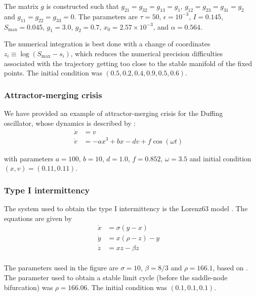 \documentclass[reprint,superscriptaddress,showpacs,amsmath,amssymb,aps,floatfix,nolongbibliography]{revtex4-2}
\theoremstyle{definition}
\begin{document}
The matrix $g$ is constructed such that $g_{21} = g_{32} = g_{13} = g_1$, $g_{12} = g_{23} = g_{31} = g_2$ and $g_{11} = g_{22} = g_{33} = 0$. The parameters are $\tau = 50$, $\epsilon = 10^{-3}$, $I = 0.145$, $S_\mathrm{max} = 0.045$, $g_1 = 3.0$, $g_2 = 0.7$, $x_0 = 2.57 \times 10^{-3}$, and $\alpha = 0.564$.

The numerical integration is best done with a change of coordinates $z_i \equiv \log(S_\mathrm{max} - s_i)$, which reduces the numerical precision difficulties associated with the trajectory getting too close to the stable manifold of the fixed points. The initial condition was $(0.5, 0.2, 0.4, 0.9, 0.5, 0.6)$. 


\subsubsection{Attractor-merging crisis}
We have provided an example of attractor-merging crisis for the Duffing oscillator, whose dynamics is described by \cite{ishii1986breakdown}: 
%
\begin{align}
    \dot{x} &= v \\ 
    \dot{v} &= -ax^3 + bx -dv + f \cos(\omega t) 
\end{align}

with parameters $a = 100$, $b = 10$, $d = 1.0$, $f = 0.852$, $\omega = 3.5$ and initial condition $(x,v) = (0.11, 0.11)$.

\subsubsection{Type I intermittency}
The system used to obtain the type I intermittency is the Lorenz63 model \cite{lorenz1963deterministic}. The equations are given by 
\begin{align}
    \dot{x} &= \sigma(y - x) \\ 
    \dot{y} &= x(\rho - z) - y \\ 
    \dot{z} &= xz - \beta z \\
\end{align}

The parameters used in the figure are $\sigma = 10$, $\beta = 8/3$ and $\rho = 166.1$, based on \cite{yorke1979metastable}. The parameter used to obtain a stable limit cycle (before the saddle-node bifurcation) was $\rho = 166.06$. The initial condition was $(0.1, 0.1, 0.1)$. 
\end{document}
